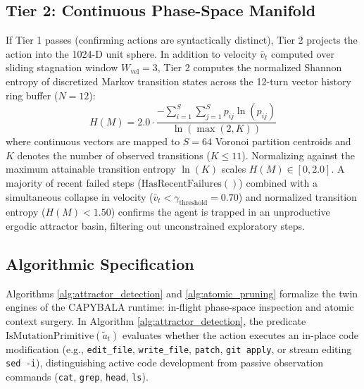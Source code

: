 \documentclass[journal]{IEEEtran}
\begin{document}
\subsection{Tier 2: Continuous Phase-Space Manifold}
If Tier 1 passes (confirming actions are syntactically distinct), Tier 2 projects the action into the 1024-D unit sphere.
In addition to velocity $\bar{v}_t$ computed over sliding stagnation window $W_{\text{vel}} = 3$, Tier 2 computes the normalized Shannon entropy of discretized Markov transition states across the 12-turn vector history ring buffer ($N = 12$):
\begin{equation}
H(M) = 2.0 \cdot \frac{-\sum_{i=1}^S \sum_{j=1}^S p_{ij} \ln(p_{ij})}{\ln(\max(2, K))}
\end{equation}
where continuous vectors are mapped to $S = 64$ Voronoi partition centroids and $K$ denotes the number of observed transitions ($K \le 11$). Normalizing against the maximum attainable transition entropy $\ln(K)$ scales $H(M) \in [0, 2.0]$. A majority of recent failed steps ($\text{HasRecentFailures}()$) combined with a simultaneous collapse in velocity ($\bar{v}_t < \gamma_{\text{threshold}} = 0.70$) and normalized transition entropy ($H(M) < 1.50$) confirms the agent is trapped in an unproductive ergodic attractor basin, filtering out unconstrained exploratory steps.

\subsection{Algorithmic Specification}
Algorithms \ref{alg:attractor_detection} and \ref{alg:atomic_pruning} formalize the twin engines of the CAPYBALA runtime: in-flight phase-space inspection and atomic context surgery. In Algorithm \ref{alg:attractor_detection}, the predicate $\text{IsMutationPrimitive}(\tilde{a}_t)$ evaluates whether the action executes an in-place code modification (e.g., \texttt{edit\_file}, \texttt{write\_file}, \texttt{patch}, \texttt{git apply}, or stream editing \texttt{sed -i}), distinguishing active code development from passive observation commands (\texttt{cat}, \texttt{grep}, \texttt{head}, \texttt{ls}).
\end{document}
